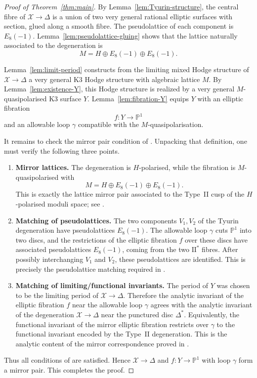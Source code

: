\documentclass[11pt]{amsart}
\theoremstyle{definition}
\newcommand{\cX}{\mathcal X}
\newcommand{\bP}{\mathbb P}
\begin{document}
\begin{proof}[Proof of Theorem~\ref{thm:main}]
By Lemma~\ref{lem:Tyurin-structure}, the central fibre of $\cX\to\Delta$ is a union of two very general rational elliptic surfaces with section, glued along a smooth fibre. The pseudolattice of each component is $E_8(-1)$. Lemma~\ref{lem:pseudolattice-gluing} shows that the lattice naturally associated to the degeneration is
\[
M=H\oplus E_8(-1)\oplus E_8(-1).
\]

Lemma~\ref{lem:limit-period} constructs from the limiting mixed Hodge structure of $\cX\to\Delta$ a very general K3 Hodge structure with algebraic lattice $M$. By Lemma~\ref{lem:existence-Y}, this Hodge structure is realized by a very general $M$-quasipolarised K3 surface $Y$. Lemma~\ref{lem:fibration-Y} equips $Y$ with an elliptic fibration
\[
f\colon Y\to\bP^1
\]
and an allowable loop $\gamma$ compatible with the $M$-quasipolarisation.

It remains to check the mirror pair condition of \cite[Definition~5.1]{GT24}. Unpacking that definition, one must verify the following three points.

\begin{enumerate}
\item \textbf{Mirror lattices.} The degeneration is $H$-polarised, while the fibration is $M$-quasipolarised with
\[
M=H\oplus E_8(-1)\oplus E_8(-1).
\]
This is exactly the lattice mirror pair associated to the Type~II cusp of the $H$-polarised moduli space; see \cite[Theorem~3.28]{GT24}.

\item \textbf{Matching of pseudolattices.} The two components $V_1,V_2$ of the Tyurin degeneration have pseudolattices $E_8(-1)$. The allowable loop $\gamma$ cuts $\bP^1$ into two discs, and the restrictions of the elliptic fibration $f$ over these discs have associated pseudolattices $E_8(-1)$, coming from the two $\mathrm{II}^*$ fibres. After possibly interchanging $V_1$ and $V_2$, these pseudolattices are identified. This is precisely the pseudolattice matching required in \cite[Definition~5.1]{GT24}.

\item \textbf{Matching of limiting/functional invariants.} The period of $Y$ was chosen to be the limiting period of $\cX\to\Delta$. Therefore the analytic invariant of the elliptic fibration $f$ near the allowable loop $\gamma$ agrees with the analytic invariant of the degeneration $\cX\to\Delta$ near the punctured disc $\Delta^*$. Equivalently, the functional invariant of the mirror elliptic fibration restricts over $\gamma$ to the functional invariant encoded by the Type~II degeneration. This is the analytic content of the mirror correspondence proved in \cite[\S5]{GT24}.
\end{enumerate}

Thus all conditions of \cite[Definition~5.1]{GT24} are satisfied. Hence $\cX\to\Delta$ and $f\colon Y\to\bP^1$ with loop $\gamma$ form a mirror pair. This completes the proof.
\end{proof}
\end{document}

